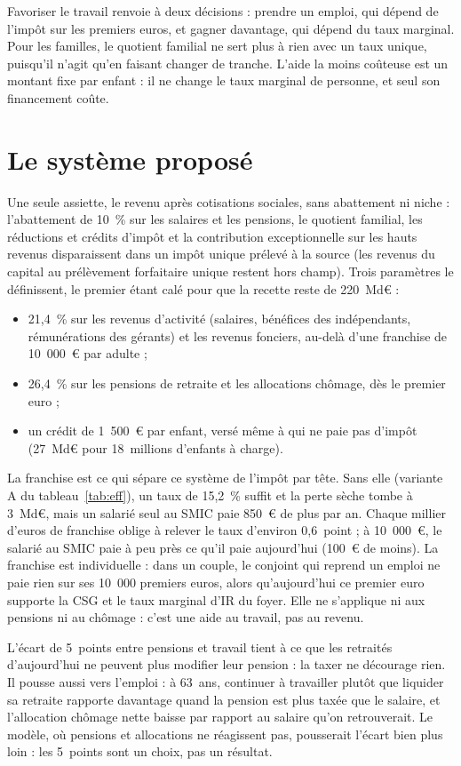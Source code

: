 \documentclass[11pt,a4paper]{article}
\begin{document}
Favoriser le travail renvoie à deux décisions : prendre un emploi, qui dépend de l'impôt sur les
premiers euros, et gagner davantage, qui dépend du taux marginal. Pour les familles, le quotient
familial ne sert plus à rien avec un taux unique, puisqu'il n'agit qu'en faisant changer de tranche.
L'aide la moins coûteuse est un montant fixe par enfant : il ne change le taux marginal de personne, et
seul son financement coûte.

\section*{Le système proposé}

Une seule assiette, le revenu après cotisations sociales, sans abattement ni niche : l'abattement de
10~\% sur les salaires et les pensions, le quotient familial, les réductions et crédits d'impôt et la
contribution exceptionnelle sur les hauts revenus disparaissent dans un impôt unique prélevé à la
source (les revenus du capital au prélèvement forfaitaire unique restent hors champ). Trois paramètres le définissent, le premier étant calé pour que la recette reste de 220~Md€ :
\begin{itemize}
\item 21,4~\% sur les revenus d'activité (salaires, bénéfices des indépendants, rémunérations des
gérants) et les revenus fonciers, au-delà d'une franchise de 10~000~€ par adulte ;
\item 26,4~\% sur les pensions de retraite et les allocations chômage, dès le premier euro ;
\item un crédit de 1~500~€ par enfant, versé même à qui ne paie pas d'impôt (27~Md€ pour 18~millions
d'enfants à charge).
\end{itemize}

La franchise est ce qui sépare ce système de l'impôt par tête. Sans elle (variante A du
tableau~\ref{tab:eff}), un taux de 15,2~\% suffit et la perte sèche tombe à 3~Md€, mais un salarié seul
au SMIC paie 850~€ de plus par an. Chaque millier d'euros de franchise oblige à relever le taux
d'environ 0,6~point ; à 10~000~€, le salarié au SMIC paie à peu près ce qu'il paie aujourd'hui (100~€ de
moins). La franchise est individuelle : dans un couple, le conjoint qui reprend un emploi ne paie rien
sur ses 10~000 premiers euros, alors qu'aujourd'hui ce premier euro supporte la CSG et le taux marginal
d'IR du foyer. Elle ne s'applique ni aux pensions ni au chômage : c'est une aide au travail, pas au
revenu.

L'écart de 5~points entre pensions et travail tient à ce que les retraités d'aujourd'hui ne peuvent
plus modifier leur pension : la taxer ne décourage rien. Il pousse aussi vers l'emploi : à 63~ans,
continuer à travailler plutôt que liquider sa retraite rapporte davantage quand la pension est plus
taxée que le salaire, et l'allocation chômage nette baisse par rapport au salaire qu'on retrouverait.
Le modèle, où pensions et allocations ne réagissent pas, pousserait l'écart bien plus loin : les
5~points sont un choix, pas un résultat.
\end{document}
